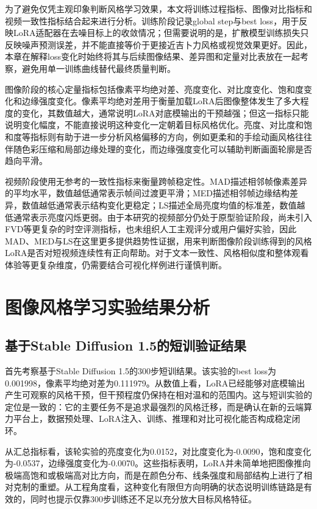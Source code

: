 为了避免仅凭主观印象判断风格学习效果，本文将训练过程指标、图像对比指标和视频一致性指标结合起来进行分析。训练阶段记录global step与best loss，用于反映LoRA适配器在去噪目标上的收敛情况；但需要说明的是，扩散模型训练损失只反映噪声预测误差，并不能直接等价于更接近吉卜力风格或视觉效果更好。因此，本章在解释loss变化时始终将其与后续图像结果、差异图和定量对比表放在一起考察，避免用单一训练曲线替代最终质量判断。

图像阶段的核心定量指标包括像素平均绝对差、亮度变化、对比度变化、饱和度变化和边缘强度变化。像素平均绝对差用于衡量加载LoRA后图像整体发生了多大程度的变化，其数值越大，通常说明LoRA对底模输出的干预越强；但这一指标只能说明变化幅度，不能直接说明这种变化一定朝着目标风格优化。亮度、对比度和饱和度等指标则有助于进一步分析风格偏移的方向，例如更柔和的手绘动画风格往往伴随色彩压缩和局部边缘处理的变化，而边缘强度变化可以辅助判断画面轮廓是否趋向平滑。

视频阶段使用无参考的一致性指标来衡量跨帧稳定性。MAD描述相邻帧像素差异的平均水平，数值越低通常表示帧间过渡更平滑；MED描述相邻帧边缘结构差异，数值越低通常表示结构变化更稳定；LS描述全局亮度均值的标准差，数值越低通常表示亮度闪烁更弱。由于本研究的视频部分仍处于原型验证阶段，尚未引入FVD等更复杂的时空评测指标，也未组织人工主观评分或用户偏好实验，因此MAD、MED与LS在这里更多提供趋势性证据，用来判断图像阶段训练得到的风格LoRA是否对短视频连续性有正向帮助。对于文本一致性、风格相似度和整体观看体验等更复杂维度，仍需要结合可视化样例进行谨慎判断。

\section{图像风格学习实验结果分析}

\subsection{基于Stable Diffusion 1.5的短训验证结果}

首先考察基于Stable Diffusion 1.5的300步短训结果。该实验的best loss为0.001998，像素平均绝对差为0.111979。从数值上看，LoRA已经能够对底模输出产生可观察的风格干预，但干预程度仍保持在相对温和的范围内。这与短训实验的定位是一致的：它的主要任务不是追求最强烈的风格迁移，而是确认在新的云端算力平台上，数据预处理、LoRA注入、训练、推理和对比可视化能否构成稳定闭环。

从汇总指标看，该轮实验的亮度变化为0.0152，对比度变化为-0.0090，饱和度变化为-0.0537，边缘强度变化为-0.0070。这些指标表明，LoRA并未简单地把图像推向极端高饱和或极端高对比方向，而是在颜色分布、线条强度和局部结构上进行了相对克制的重塑。从工程角度看，这种变化有限但方向明确的状态说明训练链路是有效的，同时也提示仅靠300步训练还不足以充分放大目标风格特征。

